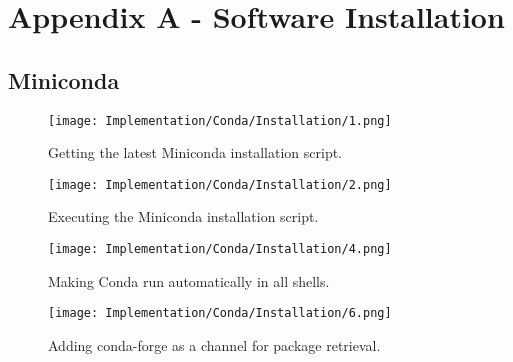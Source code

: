 \begingroup
\renewcommand\thechapter{A}
\titleformat{\chapter}[display]
{\normalfont\huge\bfseries}{}{20pt}{\Huge}
\setcounter{section}{0} %

\chapter*{Appendix A - Software Installation}

\section{Miniconda}

\begin{figure}[H]
    \centering
    \texttt{[image: Implementation/Conda/Installation/1.png]}
    \caption{Getting the latest Miniconda installation script.}
    \label{fig:CondaInstall1}
\end{figure}

\begin{figure}[H]
    \centering
    \texttt{[image: Implementation/Conda/Installation/2.png]}
    \caption{Executing the Miniconda installation script.}
    \label{fig:CondaInstall2}
\end{figure}


\begin{figure}[H]
    \centering
    \texttt{[image: Implementation/Conda/Installation/4.png]}
    \caption{Making Conda run automatically in all shells.}
    \label{fig:CondaInstall4}
\end{figure}

\begin{figure}[H]
    \centering
    \texttt{[image: Implementation/Conda/Installation/6.png]}
    \caption{Adding conda-forge as a channel for package retrieval.}
    \label{fig:CondaInstall6}
\end{figure}

